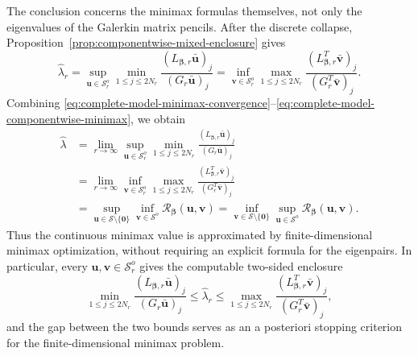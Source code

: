 \documentclass[preprint,10pt]{elsarticle}
\theoremstyle{plain}
\theoremstyle{definition}
\theoremstyle{remark}
\begin{document}
The conclusion concerns the minimax formulas themselves, not only the
eigenvalues of the Galerkin matrix pencils. After the discrete collapse,
Proposition~\ref{prop:componentwise-mixed-enclosure} gives
\begin{equation}\label{eq:complete-model-componentwise-minimax}
	\hat\lambda_r
	=
	\sup_{\mathbf u\in\mathcal S_r^o}
	\min_{1\le j\le2N_r}
	\frac{(L_{\boldsymbol\beta,r}\bar{\mathbf u})_j}
	{(G_r\bar{\mathbf u})_j}
	=
	\inf_{\mathbf v\in\mathcal S_r^o}
	\max_{1\le j\le2N_r}
	\frac{(L_{\boldsymbol\beta,r}^T\bar{\mathbf v})_j}
	{(G_r^T\bar{\mathbf v})_j}.
\end{equation}
Combining
\eqref{eq:complete-model-minimax-convergence}--\eqref{eq:complete-model-componentwise-minimax},
we obtain
\begin{align}
	\hat\lambda
	&=\lim_{r\to\infty}
	\sup_{\mathbf u\in\mathcal S_r^o}
	\min_{1\le j\le2N_r}
	\frac{(L_{\boldsymbol\beta,r}\bar{\mathbf u})_j}
	{(G_r\bar{\mathbf u})_j}
	\nonumber\\
	&=\lim_{r\to\infty}
	\inf_{\mathbf v\in\mathcal S_r^o}
	\max_{1\le j\le2N_r}
	\frac{(L_{\boldsymbol\beta,r}^T\bar{\mathbf v})_j}
	{(G_r^T\bar{\mathbf v})_j}
	\nonumber\\
	&=
	\sup_{\mathbf u\in\mathcal S\setminus\{\mathbf0\}}
	\inf_{\mathbf v\in\mathcal S^o}
	\mathcal R_{\boldsymbol\beta}(\mathbf u,\mathbf v)
	=
	\inf_{\mathbf v\in\mathcal S\setminus\{\mathbf0\}}
	\sup_{\mathbf u\in\mathcal S^o}
	\mathcal R_{\boldsymbol\beta}(\mathbf u,\mathbf v).
	\label{eq:complete-model-variational-convergence}
\end{align}
Thus the continuous minimax value is approximated by finite-dimensional
minimax optimization, without requiring an explicit formula for the
eigenpairs. In particular, every
$\mathbf u,\mathbf v\in\mathcal S_r^o$ gives the computable two-sided
enclosure
\begin{equation}\label{eq:complete-model-CW-enclosure}
	\min_{1\le j\le2N_r}
	\frac{(L_{\boldsymbol\beta,r}\bar{\mathbf u})_j}
	{(G_r\bar{\mathbf u})_j}
	\le
	\hat\lambda_r
	\le
	\max_{1\le j\le2N_r}
	\frac{(L_{\boldsymbol\beta,r}^T\bar{\mathbf v})_j}
	{(G_r^T\bar{\mathbf v})_j},
\end{equation}
and the gap between the two bounds serves as an a posteriori stopping
criterion for the finite-dimensional minimax problem.
\end{document}

